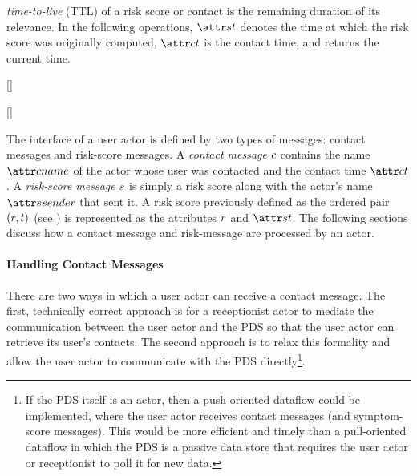 \emph{time-to-live} (TTL) of a risk score or contact is the remaining duration
of its relevance. In the following operations, $\aScoreTime$ denotes the time
at which the risk score was originally computed, $\aContactTime$ is the contact
time, and \cGetTime{} returns the current time.
%
\begin{function}{\nScoreTtl}[\vScore]
    \end{function}
    \begin{function}{\nContactTtl}[\vContact]
\end{function}
%
The interface of a user actor is defined by two types of messages: contact
messages and risk-score messages. A \emph{contact message} $c$
contains the name $\aContactName$ of the actor whose user was contacted and the
contact time $\aContactTime$. A \emph{risk-score message} $s$ is
simply a risk score along with the actor's name $\aScoreSender$ that sent it. A
risk score previously defined as the ordered pair $(r, t)$ (see
) is represented as the attributes $r$
and $\aScoreTime$. The following sections discuss how a contact message and
risk-message are processed by an actor.

\paragraph{Handling Contact Messages}\label{sec:contact-message-handling}

There are two ways in which a user actor can receive a contact message. The
first, technically correct approach is for a receptionist actor to mediate the
communication between the user actor and the PDS so that the user actor can
retrieve its user's contacts. The second approach is to relax this formality
and allow the user actor to communicate with the PDS directly\footnote{If the
PDS itself is an actor, then a push-oriented dataflow could be implemented,
where the user actor receives contact messages (and symptom-score
messages). This would be more efficient and timely than a pull-oriented
dataflow in which the PDS is a passive data store that requires the user actor
or receptionist to poll it for new data.}.

